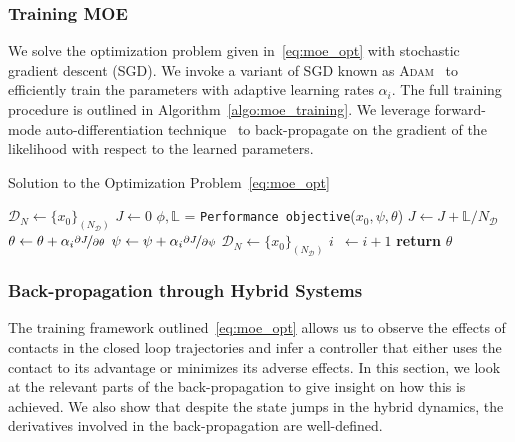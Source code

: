 \subsubsection{Training MOE}
\label{sssec:training_moe}

We solve the optimization problem given in~\eqref{eq:moe_opt} with stochastic
gradient descent (SGD).
%
We invoke a variant of SGD known as \textsc{Adam}~\cite{kingma2014adam} to
efficiently train the parameters with adaptive learning rates $\alpha_i$.
%
The full training procedure is outlined in Algorithm~\eqref{algo:moe_training}.
%
We leverage forward-mode auto-differentiation technique~\cite{revels2016forward}
to back-propagate on the gradient of the likelihood with respect to the learned
parameters.
\begin{algorithm}[tb]
      \caption{Solution to the Optimization Problem~\eqref{eq:moe_opt}}
      \label{algo:moe_training}
      \small
      \begin{algorithmic}[1]
          \algrenewcommand\algorithmicindent{0em} %
          \State $\mathcal{D}_N \gets \{x_0\}_{(N_{\mathcal{D}})}$   
          \algrenewcommand\algorithmicindent{1.1em} %
          \State $J \gets 0$
              \State $\phi, \mathbb{L}$ = \texttt{Performance objective}($x_0, \psi, \theta$) 
              \State $J \gets J + \mathbb{L}/N_{\mathcal{D}}$ 
          \EndFor
          \State $\theta \gets \theta + \alpha_i \nicefrac{\partial J}{\partial \theta}$
          \State $\psi \gets \psi + \alpha_i \nicefrac{\partial J}{\partial \psi}$
          \State $\mathcal{D}_N \gets \{x_0\}_{(N_{\mathcal{D}})}$
          \State $i \;\:\gets i + 1$
          \EndWhile
          \State \textbf{return} $\theta$
      \end{algorithmic}
  \end{algorithm}

\subsubsection{Back-propagation through Hybrid Systems}

The training framework outlined~\eqref{eq:moe_opt} allows us to observe the
effects of contacts in the closed loop trajectories and infer a controller that
either uses the contact to its advantage or minimizes its adverse effects.
%
In this section, we look at the relevant parts of the back-propagation to give
insight on how this is achieved.
%
We also show that despite the state jumps in the hybrid dynamics, the
derivatives involved in the back-propagation are well-defined.


